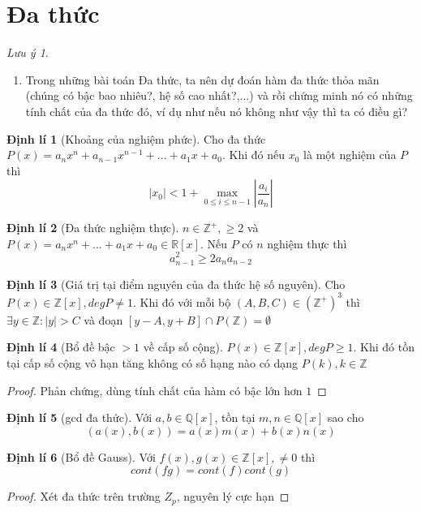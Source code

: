 \documentclass[12pt,a4paper]{article}
\theoremstyle{definition}
\newtheorem{theorem}{Định lí}[section]
\theoremstyle{remark}
\newtheorem*{remark}{Lưu ý}
\let\stdsection\section
\renewcommand\section{\newpage\stdsection}
\begin{document}
\section{Đa thức}
\begin{remark}
\begin{enumerate}
  \item Trong những bài toán Đa thức, ta nên dự đoán hàm đa thức thỏa mãn (chúng có bậc bao nhiêu?, hệ số cao nhất?,...) và rồi chứng minh nó có những tính chất của đa thức đó, ví dụ như nếu nó không như vậy thì ta có điều gì?
\end{enumerate}
\end{remark}
\begin{theorem}[Khoảng của nghiệm phức]
Cho đa thức $P(x)=a_nx^n+a_{n-1}x^{n-1}+...+a_1x+a_0$. Khi đó nếu $x_0$ là một nghiệm của $P$ thì 
$$|x_0|<1+\max_{0 \leq i\leq n-1}  \left|\dfrac{a_i}{a_n}\right|$$
\end{theorem}
\begin{theorem}[Đa thức nghiệm thực]
$n\in \mathbb{Z}^+, \geq 2$ và $P(x)=a_nx^n+...+a_1x+a_0 \in \mathbb{R}[x]$. Nếu $P$ có $n$ nghiệm thực thì $$a_{n-1}^2\geq 2a_n a_{n-2}$$
\end{theorem}
\begin{theorem}[Giá trị tại điểm nguyên của đa thức hệ số nguyên]
Cho $P(x)\in \mathbb{Z}[x], degP \neq 1$. Khi đó với mỗi bộ $(A,B,C)\in (\mathbb{Z}^+)^3$ thì $\exists y\in \mathbb{Z}: |y|>C$ và đoạn $[y-A,y+B]\cap P(\mathbb{Z})=\emptyset$

\end{theorem}
\begin{theorem}[Bổ đề bậc $>1$ về cấp số cộng]
$P(x)\in \mathbb{Z}[x], degP\geq 1$. Khi đó tồn tại cấp số cộng vô hạn tăng không có số hạng nào có dạng $P(k), k\in \mathbb{Z}$
\end{theorem}
\begin{proof}
Phản chứng, dùng tính chất của hàm có bậc lớn hơn $1$
\end{proof}
\begin{theorem}[gcd đa thức]
Với $a,b\in \mathbb{Q}[x]$, tồn tại $m,n\in \mathbb{Q}[x]$ sao cho $$(a(x),b(x))=a(x)m(x)+b(x)n(x)$$ 
\end{theorem}
\begin{theorem}[Bổ đề Gauss]
Với $f(x),g(x)\in \mathbb{Z}[x], \neq 0$ thì $$cont(fg)=cont(f)cont(g)$$
\end{theorem}
\begin{proof}
Xét đa thức trên trường $Z_p$, nguyên lý cực hạn
\end{proof}
\end{document}
